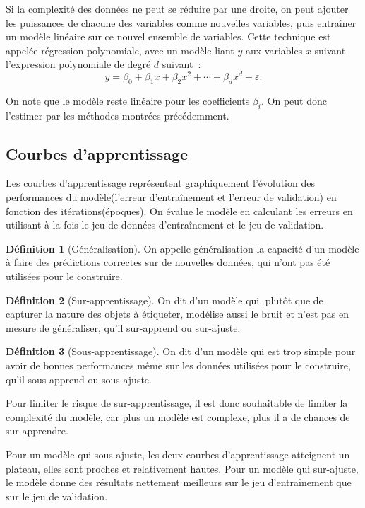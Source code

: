 \documentclass[a4paper,12pt,twoside]{report}
\theoremstyle{definition}
\newtheorem{defi}{Définition}
\theoremstyle{plain}
\theoremstyle{remark}
\begin{document}
Si la complexité des données ne peut se réduire par une droite, on peut ajouter les puissances de chacune des variables comme nouvelles variables, puis entraîner un modèle linéaire sur ce nouvel ensemble de variables. Cette technique est appelée régression polynomiale, avec un modèle liant $y$ aux variables $x$ suivant l'expression polynomiale de degré $d$ suivant~:
\[ y = \beta_0 + \beta_1 x + \beta_2 x^2 + \cdots + \beta_d x^d + \varepsilon. \]

On note que le modèle reste linéaire pour les coefficients $\beta_i$. On peut donc l'estimer par les méthodes montrées précédemment.

\subsection{Courbes d'apprentissage}

Les courbes d'apprentissage représentent graphiquement l'évolution des performances du modèle(l'erreur d'entraînement et l'erreur de validation) en fonction des itérations(époques). On évalue le modèle en calculant les erreurs en utilisant à la fois le jeu de données d'entraînement et le jeu de validation.

\begin{defi}[Généralisation]
	On appelle généralisation la capacité d'un modèle à faire des prédictions correctes sur de nouvelles données, qui n'ont pas été utilisées pour le construire.
\end{defi}

\begin{defi}[Sur-apprentissage]
	On dit d'un modèle qui, plutôt que de capturer la nature des objets à étiqueter, modélise aussi le bruit et n'est pas en mesure de généraliser, qu'il sur-apprend ou sur-ajuste.
\end{defi}

\begin{defi}[Sous-apprentissage]
	On dit d'un modèle qui est trop simple pour avoir de bonnes performances même sur les données utilisées pour le construire, qu'il sous-apprend ou sous-ajuste.
\end{defi}

Pour limiter le risque de sur-apprentissage, il est donc souhaitable de limiter la complexité du modèle, car plus un modèle est complexe, plus il a de chances de sur-apprendre.

Pour un modèle qui sous-ajuste, les deux courbes d'apprentissage atteignent un plateau, elles sont proches et relativement hautes. Pour un modèle qui sur-ajuste, le modèle donne des résultats nettement meilleurs sur le jeu d'entraînement que sur le jeu de validation.
\end{document}
